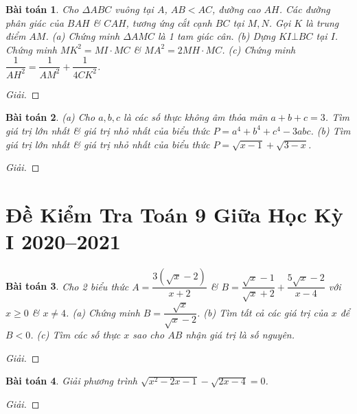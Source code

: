 \documentclass{article}
\newtheorem{baitoan}{Bài toán}
\begin{document}
\begin{baitoan}
	Cho $\Delta ABC$ vuông tại $A$, $AB < AC$, đường cao $AH$. Các đường phân giác của $BAH$ \& $CAH$, tương ứng cắt cạnh $BC$ tại $M,N$. Gọi $K$ là trung điểm $AM$. (a) Chứng minh $\Delta AMC$ là 1 tam giác cân. (b) Dựng $KI\bot BC$ tại $I$. Chứng minh $MK^2 = MI\cdot MC$ \& $MA^2 = 2MH\cdot MC$. (c) Chứng minh $\dfrac{1}{AH^2} = \dfrac{1}{AM^2} + \dfrac{1}{4CK^2}$.
\end{baitoan}

\begin{proof}[Giải]
	
\end{proof}

\begin{baitoan}
	(a) Cho $a,b,c$ là các số thực không âm thỏa mãn $a + b + c = 3$. Tìm giá trị lớn nhất \& giá trị nhỏ nhất của biểu thức $P = a^4 + b^4 + c^4 - 3abc$. (b) Tìm giá trị lớn nhất \& giá trị nhỏ nhất của biểu thức $P = \sqrt{x - 1} + \sqrt{3 - x}$.
\end{baitoan}

\begin{proof}[Giải]
	
\end{proof}


\section{Đề Kiểm Tra Toán 9 Giữa Học Kỳ I 2020--2021}

\begin{baitoan}
	Cho 2 biểu thức $A = \dfrac{3(\sqrt{x}  - 2)}{x + 2}$ \& $B = \dfrac{\sqrt{x} - 1}{\sqrt{x} + 2} + \dfrac{5\sqrt{x} - 2}{x - 4}$ với $x\ge0$ \& $x\ne4$. (a) Chứng minh $B = \dfrac{\sqrt{x}}{\sqrt{x} - 2}$. (b) Tìm tất cả các giá trị của $x$ để $B < 0$. (c) Tìm các số thực $x$ sao cho $AB$ nhận giá trị là số nguyên.
\end{baitoan}

\begin{proof}[Giải]
	
\end{proof}

\begin{baitoan}
	Giải phương trình $\sqrt{x^2 - 2x - 1} - \sqrt{2x - 4} = 0$.
\end{baitoan}

\begin{proof}[Giải]
	
\end{proof}
\end{document}
